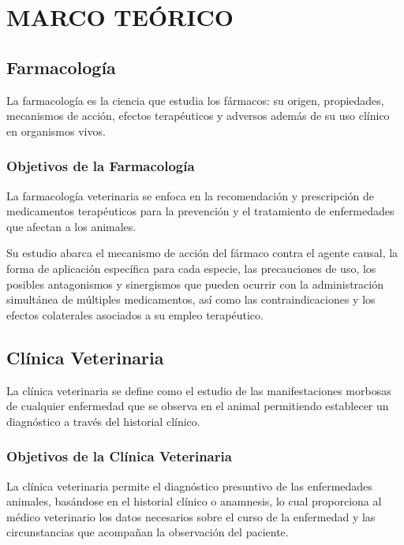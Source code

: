 \clearpage

\section{MARCO TEÓRICO}

    \subsection{Farmacología}

        La farmacología es la ciencia que estudia los fármacos: su origen, propiedades, mecanismos de acción, efectos terapéuticos y adversos además de su uso clínico en organismos vivos.  %

        \subsubsection{Objetivos de la Farmacología}

            La farmacología veterinaria se enfoca en la recomendación y prescripción de medicamentos terapéuticos para la prevención y el tratamiento de enfermedades que afectan a los animales.

			Su estudio abarca el mecanismo de acción del fármaco contra el agente causal, la forma de aplicación específica para cada especie, las precauciones de uso, los posibles antagonismos y sinergismos que pueden ocurrir con la administración simultánea de múltiples medicamentos, así como las contraindicaciones y los efectos colaterales asociados a su empleo terapéutico.  %

    \subsection{Clínica Veterinaria}

        La clínica veterinaria se define como el estudio de las manifestaciones morbosas de cualquier enfermedad que se observa en el animal permitiendo establecer un diagnóstico a través del historial clínico.  %

        \subsubsection{Objetivos de la Clínica Veterinaria}

            La clínica veterinaria permite el diagnóstico presuntivo de las enfermedades animales, basándose en el historial clínico o anamnesis, lo cual proporciona al médico veterinario los datos necesarios sobre el curso de la enfermedad y las circunstancias que acompañan la observación del paciente.  %

